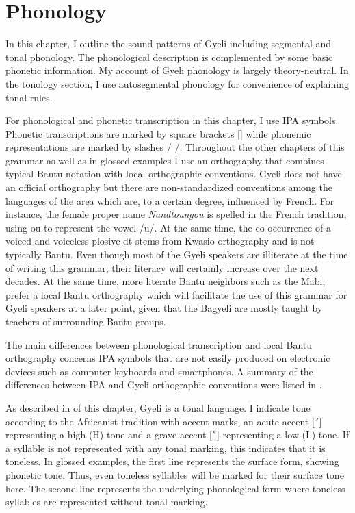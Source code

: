 \chapter{Phonology}
\label{sec:Phon}

In this chapter, I outline the sound patterns of Gyeli including segmental and tonal phonology. The phonological description is complemented by some basic phonetic information.
My account of Gyeli phonology is largely theory-neutral. In the tonology section, I use autosegmental phonology for convenience of explaining tonal rules.

For phonological and phonetic transcription in this chapter, I use IPA symbols. Phonetic transcriptions are marked by square brackets [] while phonemic representations are marked by slashes / /.
Throughout the other chapters of this grammar as well as in glossed examples I use an orthography that combines typical Bantu notation with local orthographic conventions. Gyeli does not have an official orthography but there are non-standardized conventions among the languages of the area which are, to a certain degree, influenced by French. For instance, the female proper name {\itshape Nandtoungou} is spelled in the French tradition, using {\textlangle}ou{\textrangle} to represent the vowel /u/. At the same time, the co-occurrence of a voiced and voiceless plosive {\textlangle}dt{\textrangle} stems from Kwasio orthography and is not typically Bantu.  Even though most of the Gyeli speakers are illiterate at the time of writing this grammar, their literacy will certainly increase over the next decades. At the same time, more literate Bantu neighbors such as the Mabi, prefer a local Bantu orthography which will facilitate the use of this grammar for Gyeli speakers at a later point, given that the Bagyeli are mostly taught by teachers of surrounding Bantu groups.


The main differences between phonological transcription and local Bantu orthography concerns IPA symbols that are not easily produced on electronic devices such as computer keyboards and smartphones. A summary of the differences between IPA and Gyeli orthographic  conventions were listed in . 

As described in  of this chapter, Gyeli is a tonal language. I indicate tone according to the Africanist tradition with accent marks, an acute accent [\  ́] representing a high (H) tone and a grave accent [\  ̀] representing a low (L) tone. If a syllable is not represented with any tonal marking, this indicates that it is toneless.
In glossed examples, the first line represents the surface form, showing phonetic tone. Thus, even toneless syllables will be marked for their surface tone here. The second line represents the underlying phonological form where toneless syllables are represented without tonal marking.

